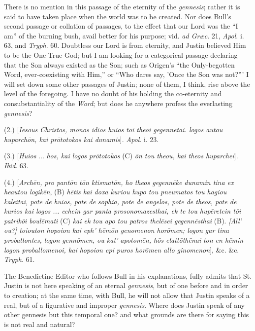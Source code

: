 There is no mention in this passage of the eternity of the \emph{gennesis};
rather it is said to have taken place when the world was to be
created. Nor does Bull's second passage or collation of passages, to
the effect that our Lord was the ``I am'' of the burning bush,
avail better for his purpose; vid. \emph{ad Græc}. 21, \emph{Apol}. i.
63, and \emph{Tryph}. 60. Doubtless our Lord is from eternity, and
Justin believed Him to be the One True God; but I am looking for a
categorical passage declaring that the Son always existed as the Son;
such as Origen's ``the Only-begotten Word, ever-coexisting with
Him,'' or ``Who dares say, 'Once the Son was not?''' I
will set down some other passages of Justin; none of them, I think,
rise above the level of the foregoing. I have no doubt of his
holding the co-eternity and consubstantiality of the \emph{Word}; but
does he anywhere profess the everlasting \emph{gennesis}?

(2.) [\emph{I\={e}sous Christos, monos idi\={o}s huios t\={o}i
the\={o}i gegenn\={e}tai. logos autou huparch\={o}n, kai pr\={o}totokos
kai dunamis}]. \emph{Apol}. i. 23.

(3.) [\emph{Huios} ... \emph{hos, kai logos pr\={o}totokos} (C) \emph{\={o}n
tou theou, kai theos huparchei}]. \emph{Ibid}. 63.

(4.) [\emph{Arch\={e}n, pro pant\={o}n t\={o}n ktismat\={o}n,
ho theos gegenn\={e}ke dunamin tina ex heautou logik\={e}n},
(B) \emph{h\={e}tis kai doxa kuriou hupo tou pneumatos tou hagiou
kaleitai, pote de huios, pote de sophia, pote de angelos, pote de
theos, pote de kurios kai logos ... echein gar panta prosonomazesthai,
ek te tou hup\={e}retein t\={o}i patrik\={o}i boul\={e}mati}
(C) \emph{kai ek tou apo tou patros thel\={e}sei gegenn\={e}sthai}
(B). \emph{[All' ou?] toiouton hopoion kai eph' h\={e}m\={o}n
genomenon hor\={o}men; logon gar tina proballontes, logon genn\={o}men,
ou kat' apotom\={e}n, h\={o}s elatt\={o}th\={e}nai}
\emph{ton en h\={e}min logon proballomenoi, kai hopoion epi
puros hor\={o}men allo ginomenon}], \&c. \&c. \emph{Tryph}.
61.

The Benedictine Editor who follows Bull in his explanations, fully
admits that St. Justin is not here speaking of an eternal \emph{gennesis},
but of one before and in order to creation; at the same time, with
Bull, he will not allow that Justin speaks of a real, but of a
figurative and improper \emph{gennesis}. Where does Justin speak of
any other gennesis but this temporal one? and what grounds are there
for saying this is not real and natural?

